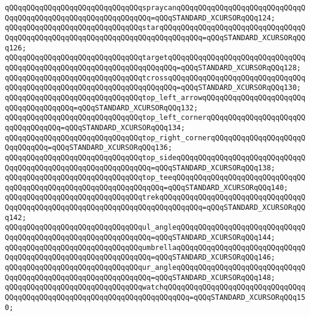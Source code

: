 \verb|qQQqqQQqqQQqqQQqqQQqqQQqqQQqqQQqspraycanqQQqqQQqqQQqqQQqqQQqqQQqqQQqqQQqqQQqqQQqqQQqqQQqqQQqqQQqqQQqqQQq=qQQqSTANDARD_XCURSORqQQq124;|\newline
\verb|qQQqqQQqqQQqqQQqqQQqqQQqqQQqqQQqstarqQQqqQQqqQQqqQQqqQQqqQQqqQQqqQQqqQQqqQQqqQQqqQQqqQQqqQQqqQQqqQQqqQQqqQQqqQQqqQQq=qQQqSTANDARD_XCURSORqQQq126;|\newline
\verb|qQQqqQQqqQQqqQQqqQQqqQQqqQQqqQQqtargetqQQqqQQqqQQqqQQqqQQqqQQqqQQqqQQqqQQqqQQqqQQqqQQqqQQqqQQqqQQqqQQqqQQqqQQq=qQQqSTANDARD_XCURSORqQQq128;|\newline
\verb|qQQqqQQqqQQqqQQqqQQqqQQqqQQqqQQqtcrossqQQqqQQqqQQqqQQqqQQqqQQqqQQqqQQqqQQqqQQqqQQqqQQqqQQqqQQqqQQqqQQqqQQqqQQq=qQQqSTANDARD_XCURSORqQQq130;|\newline
\verb|qQQqqQQqqQQqqQQqqQQqqQQqqQQqqQQqtop_left_arrowqQQqqQQqqQQqqQQqqQQqqQQqqQQqqQQqqQQqqQQq=qQQqSTANDARD_XCURSORqQQq132;|\newline
\verb|qQQqqQQqqQQqqQQqqQQqqQQqqQQqqQQqtop_left_cornerqQQqqQQqqQQqqQQqqQQqqQQqqQQqqQQqqQQq=qQQqSTANDARD_XCURSORqQQq134;|\newline
\verb|qQQqqQQqqQQqqQQqqQQqqQQqqQQqqQQqtop_right_cornerqQQqqQQqqQQqqQQqqQQqqQQqqQQqqQQq=qQQqSTANDARD_XCURSORqQQq136;|\newline
\verb|qQQqqQQqqQQqqQQqqQQqqQQqqQQqqQQqtop_sideqQQqqQQqqQQqqQQqqQQqqQQqqQQqqQQqqQQqqQQqqQQqqQQqqQQqqQQqqQQqqQQq=qQQqSTANDARD_XCURSORqQQq138;|\newline
\verb|qQQqqQQqqQQqqQQqqQQqqQQqqQQqqQQqtop_teeqQQqqQQqqQQqqQQqqQQqqQQqqQQqqQQqqQQqqQQqqQQqqQQqqQQqqQQqqQQqqQQqqQQq=qQQqSTANDARD_XCURSORqQQq140;|\newline
\verb|qQQqqQQqqQQqqQQqqQQqqQQqqQQqqQQqtrekqQQqqQQqqQQqqQQqqQQqqQQqqQQqqQQqqQQqqQQqqQQqqQQqqQQqqQQqqQQqqQQqqQQqqQQqqQQqqQQq=qQQqSTANDARD_XCURSORqQQq142;|\newline
\verb|qQQqqQQqqQQqqQQqqQQqqQQqqQQqqQQqul_angleqQQqqQQqqQQqqQQqqQQqqQQqqQQqqQQqqQQqqQQqqQQqqQQqqQQqqQQqqQQqqQQq=qQQqSTANDARD_XCURSORqQQq144;|\newline
\verb|qQQqqQQqqQQqqQQqqQQqqQQqqQQqqQQqumbrellaqQQqqQQqqQQqqQQqqQQqqQQqqQQqqQQqqQQqqQQqqQQqqQQqqQQqqQQqqQQqqQQq=qQQqSTANDARD_XCURSORqQQq146;|\newline
\verb|qQQqqQQqqQQqqQQqqQQqqQQqqQQqqQQqur_angleqQQqqQQqqQQqqQQqqQQqqQQqqQQqqQQqqQQqqQQqqQQqqQQqqQQqqQQqqQQqqQQq=qQQqSTANDARD_XCURSORqQQq148;|\newline
\verb|qQQqqQQqqQQqqQQqqQQqqQQqqQQqqQQqwatchqQQqqQQqqQQqqQQqqQQqqQQqqQQqqQQqqQQqqQQqqQQqqQQqqQQqqQQqqQQqqQQqqQQqqQQqqQQq=qQQqSTANDARD_XCURSORqQQq150;|\newline
